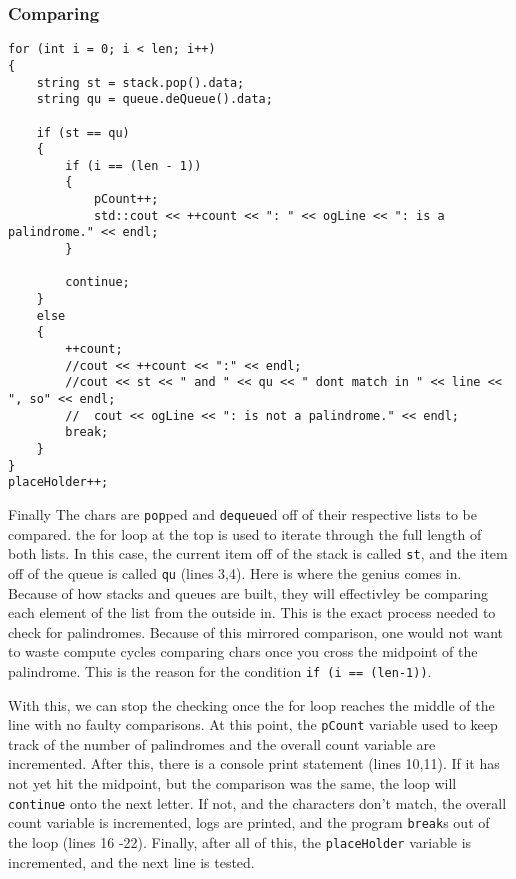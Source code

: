 \documentclass[letterpaper, 10pt]{article}
\begin{document}
\subsubsection{Comparing}
\begin{addmargin}[-5em]{1em}
\begin{small}
 \begin{verbatim}
for (int i = 0; i < len; i++)
{
    string st = stack.pop().data;
    string qu = queue.deQueue().data;

    if (st == qu)
    {
        if (i == (len - 1))
        {
            pCount++;
            std::cout << ++count << ": " << ogLine << ": is a palindrome." << endl;
        }

        continue;
    }
    else
    {
        ++count;
        //cout << ++count << ":" << endl;
        //cout << st << " and " << qu << " dont match in " << line << ", so" << endl;
        //	cout << ogLine << ": is not a palindrome." << endl;
        break;
    }
}
placeHolder++;
\end{verbatim}
\end{small}
\end{addmargin}

Finally The chars are \texttt{pop}ped and \texttt{dequeue}d off of their respective lists to be compared. the for loop at the top is used to iterate through the full length of both lists. In this case, the current item off of the stack is called \texttt{st}, and the item off of the queue is called \texttt{qu} (lines 3,4). Here is where the genius comes in. Because of how stacks and queues are built, they will effectivley be comparing  each element of the list from the outside in. This is the exact process needed to check for palindromes. Because of this mirrored comparison, one would not want to waste compute cycles comparing chars once you cross the midpoint of the palindrome. This is the reason for the condition \texttt{if (i == (len-1))}.

With this, we can stop the checking once the for loop reaches the middle of the line with no faulty comparisons. At this point, the \texttt{pCount} variable used to keep track of the number of palindromes and the overall count variable are incremented. After this, there is a console print statement (lines 10,11). If it has not yet hit the midpoint, but the comparison was the same, the loop will \texttt{continue} onto the next letter. If not, and the characters don't match, the overall count variable is incremented, logs are printed, and the program \texttt{break}s out of the loop (lines 16 -22). Finally, after all of this, the \texttt{placeHolder} variable is incremented, and the next line is tested.
\newpage
\end{document}

